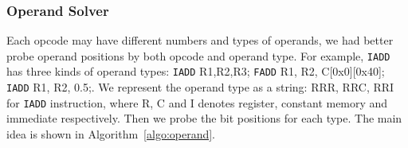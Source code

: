 
\subsubsection{Operand Solver}
Each opcode may have different numbers and types of operands, we had better probe operand positions by both opcode and operand type. 
For example, {\tt IADD} has three kinds of operand types: {\tt IADD} R1,R2,R3; {\tt FADD} R1, R2,
C[0x0][0x40]; {\tt IADD} R1, R2, 0.5;. We represent the operand type as a string:
RRR, RRC, RRI for {\tt IADD} instruction, where R, C and I denotes register, constant
memory and immediate respectively. Then we probe the bit positions for each type.
The main idea is shown in Algorithm~\ref{algo:operand}.

